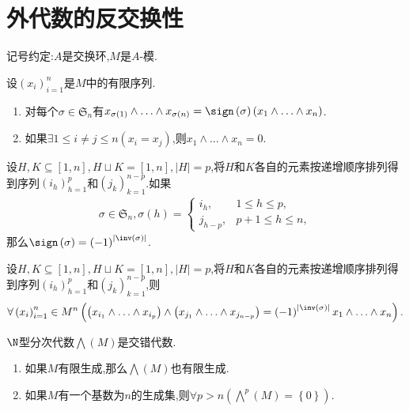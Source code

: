 \section{外代数的反交换性}

记号约定:$A$是交换环,$M$是$A$-模.

\begin{proposition}{}{}
	设$\left(x_{i}\right)_{i=1}^{n}$是$M$中的有限序列.
	\begin{enumerate}
		\item 对每个$\sigma\in\mathfrak{S}_{n}$有$x_{\sigma\left(1\right)}\wedge\ldots\wedge x_{\sigma\left(n\right)}=\sign\left(\sigma\right)\left(x_{1}\wedge\ldots\wedge x_{n}\right)$.
		\item 如果$\exists 1\leq i\neq j\leq n\left(x_{i}=x_{j}\right)$,则$x_{1}\wedge\ldots\wedge x_{n}=0$.
	\end{enumerate}
\end{proposition}

\begin{lemma}{}{}
	设$H,K\subseteq\left[1,n\right],H\sqcup K=\left[1,n\right],\left|H\right|=p$,将$H$和$K$各自的元素按递增顺序排列得到序列$\left(i_{h}\right)_{h=1}^{p}$和$\left(j_{k}\right)_{k=1}^{n-p}$.如果
	\begin{align*}
		\sigma\in\mathfrak{S}_{n},\sigma\left(h\right)=
		\begin{cases}
			i_{h},&1\leq h\leq p,\\
			j_{h-p},&p+1\leq h\leq n,
		\end{cases}
	\end{align*}
	那么$\sign\left(\sigma\right)=\left(-1\right)^{\left|\inv\left(\sigma\right)\right|}$.
\end{lemma}

\begin{corollary}{}{}
	设$H,K\subseteq\left[1,n\right],H\sqcup K=\left[1,n\right],\left|H\right|=p$,将$H$和$K$各自的元素按递增顺序排列得到序列$\left(i_{h}\right)_{h=1}^{p}$和$\left(j_{k}\right)_{k=1}^{n-p}$,则
	\begin{align*}
		\forall\left(x_{i}\right)_{i=1}^{n}\in M^{n}\left(\left(x_{i_{1}}\wedge\ldots\wedge x_{i_{p}}\right)\wedge\left(x_{j_{1}}\wedge\ldots\wedge x_{j_{n-p}}\right)=\left(-1\right)^{\left|\inv\left(\sigma\right)\right|}x_{1}\wedge\ldots\wedge x_{n}\right).
	\end{align*}
\end{corollary}

\begin{corollary}{}{}
	$\N$型分次代数$\bigwedge\left(M\right)$是交错代数.
\end{corollary}

\begin{proposition}{}{}
	\begin{enumerate}
		\item 如果$M$有限生成,那么$\bigwedge\left(M\right)$也有限生成.
		\item 如果$M$有一个基数为$n$的生成集,则$\forall p>n\left(\bigwedge^{p}\left(M\right)=\left\{0\right\}\right)$.
	\end{enumerate}
\end{proposition}








